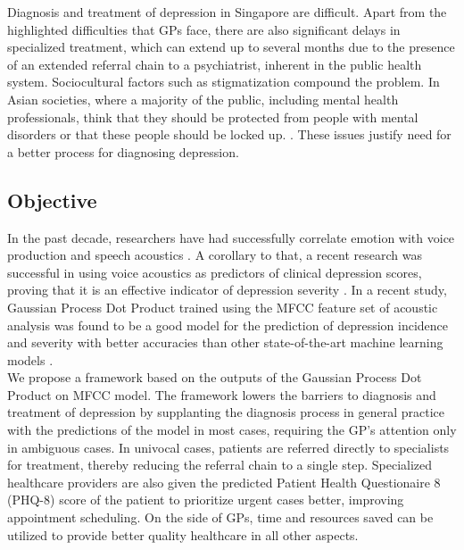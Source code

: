 \documentclass{article}
\begin{document}
	Diagnosis and treatment of depression in Singapore are difficult. Apart from the highlighted difficulties that GPs face, there are also significant delays in specialized treatment, which can extend up to several months due to the presence of an extended referral chain to a psychiatrist, inherent in the public health system. Sociocultural factors such as stigmatization compound the problem. In Asian societies, where a majority of the public, including mental health professionals, think that they should be protected from people with mental disorders or that these people should be locked up. \cite{chong2009}. These issues justify need for a better process for diagnosing depression.
	
	\subsection{Objective}
	In the past decade, researchers have had successfully correlate emotion with voice production and speech acoustics \cite{uwa2001}. 
    A corollary to that, a recent research was successful in using voice acoustics as predictors of clinical depression scores, proving that it is an effective indicator of depression severity \cite{jov2016}. In a recent study, Gaussian Process Dot Product trained using the MFCC feature set of acoustic analysis was found to be a good model for the prediction of depression incidence and severity with better accuracies than other state-of-the-art machine learning models \cite{cs42462016}.\\

	We propose a framework based on the outputs of the Gaussian Process Dot Product on MFCC model. The framework lowers the barriers to diagnosis and treatment of depression by supplanting the diagnosis process in general practice with the predictions of the model in most cases, requiring the GP's attention only in ambiguous cases. In univocal cases, patients are referred directly to specialists for treatment, thereby reducing the referral chain to a single step. Specialized healthcare providers are also given the predicted Patient Health Questionaire 8 (PHQ-8) score of the patient to prioritize urgent cases better, improving appointment scheduling. On the side of GPs, time and resources saved can be utilized to provide better quality healthcare in all other aspects.
	
\end{document}
